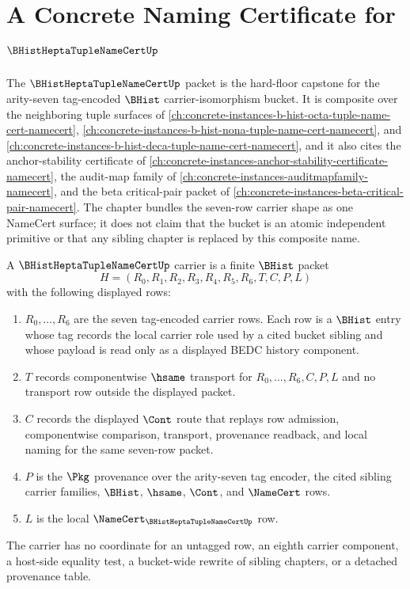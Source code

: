 \chapter{A Concrete Naming Certificate for $\BHistHeptaTupleNameCertUp$}
\label{ch:concrete-instances-b-hist-hepta-tuple-name-cert-namecert}

The $\BHistHeptaTupleNameCertUp$ packet is the hard-floor capstone for the arity-seven tag-encoded $\BHist$ carrier-isomorphism bucket. It is composite over the neighboring tuple surfaces of \autoref{ch:concrete-instances-b-hist-octa-tuple-name-cert-namecert}, \autoref{ch:concrete-instances-b-hist-nona-tuple-name-cert-namecert}, and \autoref{ch:concrete-instances-b-hist-deca-tuple-name-cert-namecert}, and it also cites the anchor-stability certificate of \autoref{ch:concrete-instances-anchor-stability-certificate-namecert}, the audit-map family of \autoref{ch:concrete-instances-auditmapfamily-namecert}, and the beta critical-pair packet of \autoref{ch:concrete-instances-beta-critical-pair-namecert}. The chapter bundles the seven-row carrier shape as one NameCert surface; it does not claim that the bucket is an atomic independent primitive or that any sibling chapter is replaced by this composite name.

\begin{definition}
\label{def:b-hist-hepta-tuple-name-cert-carrier}
A $\BHistHeptaTupleNameCertUp$ carrier is a finite $\BHist$ packet
$$
H=(R_0,R_1,R_2,R_3,R_4,R_5,R_6,T,C,P,L)
$$
with the following displayed rows:
\begin{enumerate}
\item $R_0,\ldots,R_6$ are the seven tag-encoded carrier rows. Each row is a $\BHist$ entry whose tag records the local carrier role used by a cited bucket sibling and whose payload is read only as a displayed BEDC history component.
\item $T$ records componentwise $\hsame$ transport for $R_0,\ldots,R_6,C,P,L$ and no transport row outside the displayed packet.
\item $C$ records the displayed $\Cont$ route that replays row admission, componentwise comparison, transport, provenance readback, and local naming for the same seven-row packet.
\item $P$ is the $\Pkg$ provenance over the arity-seven tag encoder, the cited sibling carrier families, $\BHist$, $\hsame$, $\Cont$, and $\NameCert$ rows.
\item $L$ is the local $\NameCert_{\BHistHeptaTupleNameCertUp}$ row.
\end{enumerate}
The carrier has no coordinate for an untagged row, an eighth carrier component, a host-side equality test, a bucket-wide rewrite of sibling chapters, or a detached provenance table.
\end{definition}

